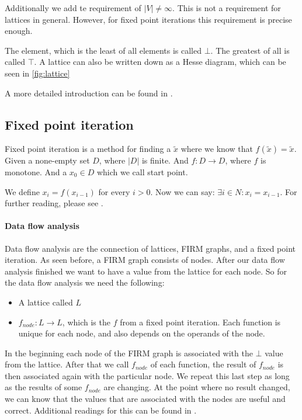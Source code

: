 Additionally we add te requirement of $|V| \not= \infty$. This is not a requirement for lattices in general. However, for fixed point iterations this requirement is precise enough.

The element, which is the least of all elements is called $\bot$. The greatest of all is called $\top$. A lattice can also be written down as a Hesse diagram, which can be seen in \autoref{fig:lattice}

A more detailed introduction can be found in \cite{lattice_theory}.

\subsection{Fixed point iteration}
Fixed point iteration is a method for finding a $\tilde{x}$ where we know that $f(\tilde{x})=\tilde{x}$. \newline
Given a none-empty set $D$, where $|D|$ is finite. And $f: D \rightarrow D$, where $f$ is monotone.
And a $x_0 \in D$ which we call start point.

We define $x_i=f(x_{i-1})$ for every $i > 0$. Now we can say: $\exists i \in N : x_i = x_{i-1}$. For further reading, please see \cite{fixed-point-theory}.


\paragraph{Data flow analysis}
Data flow analysis are the connection of lattices, FIRM graphs, and a fixed point iteration.
As seen before, a FIRM graph consists of nodes. After our data flow analysis finished we want to have a value from the lattice for each node.
So for the data flow analysis we need the following:
\begin{itemize}
	\item A lattice called $L$
	\item $f _{node}:L \rightarrow L$, which is the $f$ from a fixed point iteration. Each function is unique for each node, and also depends on the operands of the node.
\end{itemize}
In the beginning each node of the FIRM graph is associated with the $\bot$ value from the lattice. After that we call $f_{node}$ of each function, the result of $f_{node}$ is then associated again with the particular node. We repeat this last step as long as the results of some $f_{node}$ are changing. At the point where no result changed, we can know that the values that are associated with the nodes are useful and correct. Additional readings for this can be found in \cite{data-flow-theory}.

